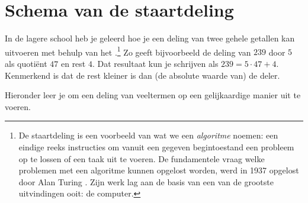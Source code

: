 \documentclass{ximera}
\begin{document}
\section{Schema van de staartdeling}

In de lagere school heb je geleerd hoe je een deling van twee gehele getallen kan uitvoeren met behulp van het .\footnote{De staartdeling is een voorbeeld van wat we een {\em algoritme} noemen: een eindige reeks instructies om vanuit een gegeven begintoestand een probleem op te lossen of een taak uit te voeren. De fundamentele vraag welke problemen met een algoritme kunnen opgelost worden, werd in 1937 opgelost door Alan Turing \cite{Turing}. Zijn werk lag aan de basis van een van de grootste uitvindingen ooit: de computer.} Zo geeft bijvoorbeeld de deling van $239$ door $5$ als quoti\"ent $47$ en rest $4$. Dat resultaat kun je schrijven als $239 = 5 \cdot 47 + 4$. Kenmerkend is dat de rest kleiner is dan (de absolute waarde van) de deler. 

Hieronder leer je om een deling van veeltermen op een gelijkaardige manier uit te voeren.
\end{document}
